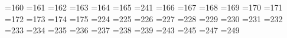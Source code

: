 =160 %
{}=161 %
{}=162 %
{}=163 %
{}=164 %
{}=165 %
{}=241 %
{}=166 %
{}=167 %
{}=168 %
{}=169 %
{}=170 %
{}=171 %
{}=172 %
{}=173 %
{}=174 %
{}=175 %
{}=224 %
{}=225 %
{}=226 %
{}=227 %
{}=228 %
{}=229 %
{}=230 %
{}=231 %
{}=232 %
{}=233 %
{}=234 %
{}=235 %
{}=236 %
{}=237 %
{}=238 %
{}=239 %
{}=243 %
{}=245 %
{}=247 %
{}=249 %
           
        